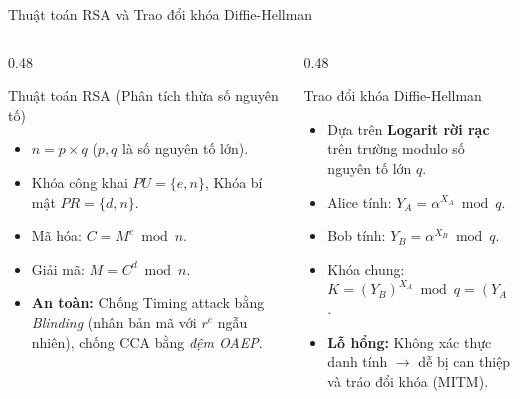 \documentclass[10pt, aspectratio=169]{beamer}
\begin{document}
\begin{frame}{Thuật toán RSA và Trao đổi khóa Diffie-Hellman}
    \begin{columns}[onlytextwidth]
        \begin{column}{0.48\textwidth}
            \begin{block}{Thuật toán RSA (Phân tích thừa số nguyên tố)}
                \begin{itemize}
                    \item $n = p \times q$ ($p, q$ là số nguyên tố lớn).
                    \item Khóa công khai $PU = \{e, n\}$, Khóa bí mật $PR = \{d, n\}$.
                    \item Mã hóa: $C = M^e \bmod n$.
                    \item Giải mã: $M = C^d \bmod n$.
                    \item \textbf{An toàn:} Chống Timing attack bằng \textit{Blinding} (nhân bản mã với $r^e$ ngẫu nhiên), chống CCA bằng \textit{đệm OAEP}.
                \end{itemize}
            \end{block}
        \end{column}
        \begin{column}{0.48\textwidth}
            \begin{block}{Trao đổi khóa Diffie-Hellman}
                \begin{itemize}
                    \item Dựa trên \textbf{Logarit rời rạc} trên trường modulo số nguyên tố lớn $q$.
                    \item Alice tính: $Y_A = \alpha^{X_A} \bmod q$.
                    \item Bob tính: $Y_B = \alpha^{X_B} \bmod q$.
                    \item Khóa chung: $K = (Y_B)^{X_A} \bmod q = (Y_A)^{X_B} \bmod q = \alpha^{X_A \cdot X_B} \bmod q$.
                    \item \textbf{Lỗ hổng:} Không xác thực danh tính $\rightarrow$ dễ bị can thiệp và tráo đổi khóa (MITM).
                \end{itemize}
            \end{block}
        \end{column}
    \end{columns}
\end{frame}
\end{document}
